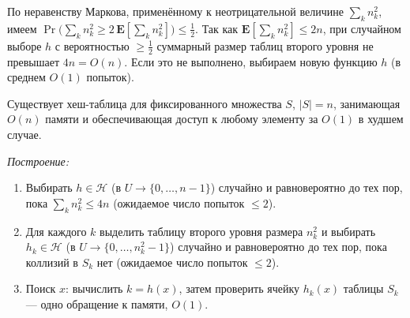 \begin{Corollary}{}{}
	По неравенству Маркова, применённому к неотрицательной величине $\sum_k n_k^2$, имеем $\Pr\!\bigl(\sum_k n_k^2 \geq 2\,\mathbf{E}[\sum_k n_k^2]\bigr) \leq \tfrac{1}{2}$. Так как $\mathbf{E}[\sum_k n_k^2] \leq 2n$, при случайном выборе $h$ с вероятностью $\geq \tfrac{1}{2}$ суммарный размер таблиц второго уровня не превышает $4n = O(n)$. Если это не выполнено, выбираем новую функцию $h$ (в среднем $O(1)$ попыток).
\end{Corollary}

\begin{Corollary}{}{}
	Существует хеш-таблица для фиксированного множества $S$, $|S|=n$, занимающая $O(n)$ памяти и обеспечивающая доступ к любому элементу за $O(1)$ в худшем случае.
	
	\emph{Построение:}
	\begin{enumerate}
		\item Выбирать $h \in \mathcal{H}$ (в $U \to \{0,\ldots,n-1\}$) случайно и равновероятно до тех пор, пока $\sum_k n_k^2 \leq 4n$ (ожидаемое число попыток $\leq 2$).
		\item Для каждого $k$ выделить таблицу второго уровня размера $n_k^2$ и выбирать $h_k \in \mathcal{H}$ (в $U \to \{0,\ldots,n_k^2-1\}$) случайно и равновероятно до тех пор, пока коллизий в $S_k$ нет (ожидаемое число попыток $\leq 2$).
		\item Поиск $x$: вычислить $k = h(x)$, затем проверить ячейку $h_k(x)$ таблицы $S_k$ --- одно обращение к памяти, $O(1)$.
	\end{enumerate}
\end{Corollary}